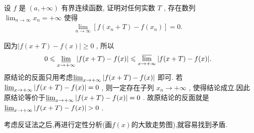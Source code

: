 \documentclass[../../main.tex]{subfiles}
\begin{document}
\begin{example}
设 \(f\) 是 \((a, +\infty)\) 有界连续函数, 证明对任何实数 \(T\) , 存在数列 \(\lim_{n \to \infty} x_n = +\infty\) 使得
\begin{align*}
\lim_{n \to \infty} [f(x_n + T) - f(x_n)] = 0.
\end{align*}
\end{example}
\begin{remark}
因为\(\vert f(x + T) - f(x)\vert \geqslant 0\) , 所以
\begin{align*}
0\leqslant \varliminf_{x \to +\infty} \vert f(x + T) - f(x)\vert \leqslant \varlimsup_{x \to +\infty} \vert f(x + T) - f(x)\vert.
\end{align*}
原结论的反面只用考虑\(\varliminf_{x \to +\infty} \vert f(x + T) - f(x)\vert\) 即可. 若\(\varliminf_{x \to +\infty} \vert f(x + T) - f(x)\vert = 0\) , 则一定存在子列 \(x_n \to +\infty\) , 使得结论成立.因此原结论等价于\(\varliminf_{x \to +\infty} \vert f(x + T) - f(x)\vert = 0\) .
故原结论的反面就是\(\varliminf_{x \to +\infty} \vert f(x + T) - f(x)\vert > 0\) .
\end{remark}
\begin{note}
考虑反证法之后,再进行定性分析(画$f(x)$的大致走势图),就容易找到矛盾.
\end{note}
\end{document}
